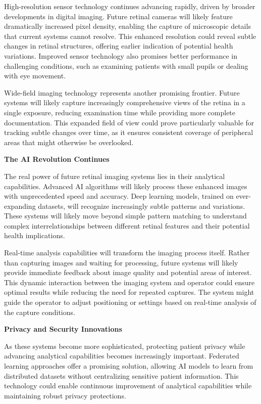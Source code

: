 \documentclass[
  Letterpaper,
]{scrbook}
\begin{document}
High-resolution sensor technology continues advancing rapidly, driven by
broader developments in digital imaging. Future retinal cameras will
likely feature dramatically increased pixel density, enabling the
capture of microscopic details that current systems cannot resolve. This
enhanced resolution could reveal subtle changes in retinal structures,
offering earlier indication of potential health variations. Improved
sensor technology also promises better performance in challenging
conditions, such as examining patients with small pupils or dealing with
eye movement.

Wide-field imaging technology represents another promising frontier.
Future systems will likely capture increasingly comprehensive views of
the retina in a single exposure, reducing examination time while
providing more complete documentation. This expanded field of view could
prove particularly valuable for tracking subtle changes over time, as it
ensures consistent coverage of peripheral areas that might otherwise be
overlooked.

\textbf{The AI Revolution Continues}

The real power of future retinal imaging systems lies in their
analytical capabilities. Advanced AI algorithms will likely process
these enhanced images with unprecedented speed and accuracy. Deep
learning models, trained on ever-expanding datasets, will recognize
increasingly subtle patterns and variations. These systems will likely
move beyond simple pattern matching to understand complex
interrelationships between different retinal features and their
potential health implications.

Real-time analysis capabilities will transform the imaging process
itself. Rather than capturing images and waiting for processing, future
systems will likely provide immediate feedback about image quality and
potential areas of interest. This dynamic interaction between the
imaging system and operator could ensure optimal results while reducing
the need for repeated captures. The system might guide the operator to
adjust positioning or settings based on real-time analysis of the
capture conditions.

\textbf{Privacy and Security Innovations}

As these systems become more sophisticated, protecting patient privacy
while advancing analytical capabilities becomes increasingly important.
Federated learning approaches offer a promising solution, allowing AI
models to learn from distributed datasets without centralizing sensitive
patient information. This technology could enable continuous improvement
of analytical capabilities while maintaining robust privacy protections.
\end{document}
